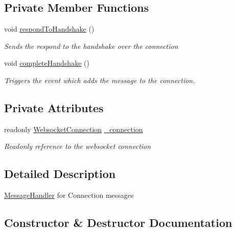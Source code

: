 \subsection*{Private Member Functions}
\begin{DoxyCompactItemize}
\item 
void \hyperlink{class_web_analyzer_1_1_server_1_1_message_handler_1_1_connection_message_handler_a2f23a8e23baf509038d8b6a20ba55c11}{respond\+To\+Handshake} ()
\begin{DoxyCompactList}\small\item\em Sends the respond to the handshake over the connection \end{DoxyCompactList}\item 
void \hyperlink{class_web_analyzer_1_1_server_1_1_message_handler_1_1_connection_message_handler_ae7bab85dfd420ef31994e42ec84cf99c}{complete\+Handshake} ()
\begin{DoxyCompactList}\small\item\em Triggers the event which adds the message to the connection. \end{DoxyCompactList}\end{DoxyCompactItemize}
\subsection*{Private Attributes}
\begin{DoxyCompactItemize}
\item 
readonly \hyperlink{class_web_analyzer_1_1_server_1_1_websocket_connection}{Websocket\+Connection} \hyperlink{class_web_analyzer_1_1_server_1_1_message_handler_1_1_connection_message_handler_ac9450ddba733401319fb68606dcfd3a3}{\+\_\+connection}
\begin{DoxyCompactList}\small\item\em Readonly reference to the websocket connection \end{DoxyCompactList}\end{DoxyCompactItemize}


\subsection{Detailed Description}
\hyperlink{namespace_web_analyzer_1_1_server_1_1_message_handler}{Message\+Handler} for Connection messages 



\subsection{Constructor \& Destructor Documentation}
\hypertarget{class_web_analyzer_1_1_server_1_1_message_handler_1_1_connection_message_handler_af2d4c77349a43145f081e572a859952c}{}
